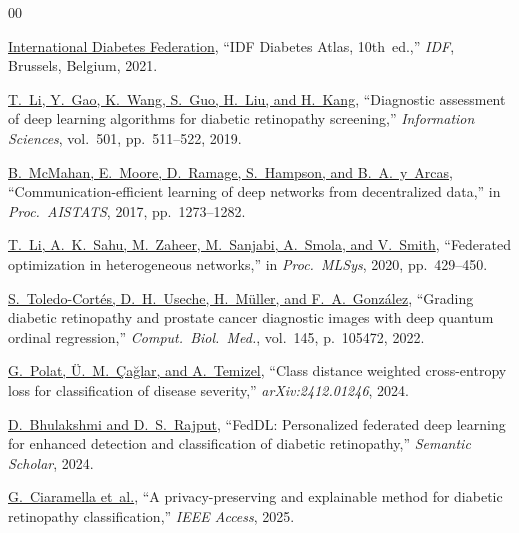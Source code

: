 \balance  %

\hypersetup{allcolors=black, hidelinks}
\begin{thebibliography}{00}

\href{https://www.diabetesatlas.org}{International
Diabetes Federation}, ``IDF Diabetes Atlas, 10th~ed.,''
\textit{IDF}, Brussels, Belgium, 2021.

\href{https://doi.org/10.1016/j.ins.2019.06.011}{T.~Li,
Y.~Gao, K.~Wang, S.~Guo, H.~Liu, and H.~Kang},
``Diagnostic assessment of deep learning algorithms
for diabetic retinopathy screening,''
\textit{Information Sciences}, vol.~501,
pp.~511--522, 2019.

\href{https://proceedings.mlr.press/v54/mcmahan17a.html}{B.~McMahan,
E.~Moore, D.~Ramage, S.~Hampson, and B.~A.~y~Arcas},
``Communication-efficient learning of deep networks
from decentralized data,''
in \textit{Proc.\ AISTATS}, 2017, pp.~1273--1282.

\href{https://proceedings.mlsys.org/paper_files/paper/2020/hash/38af86134b65d0f10fe33d30dd76442e-Abstract.html}{T.~Li,
A.~K.~Sahu, M.~Zaheer, M.~Sanjabi, A.~Smola, and V.~Smith},
``Federated optimization in heterogeneous networks,''
in \textit{Proc.\ MLSys}, 2020, pp.~429--450.

\href{https://doi.org/10.1016/j.compbiomed.2022.105472}{S.~Toledo-Cort\'{e}s,
D.~H.~Useche, H.~M\"{u}ller, and F.~A.~Gonz\'{a}lez},
``Grading diabetic retinopathy and prostate cancer
diagnostic images with deep quantum ordinal regression,''
\textit{Comput.\ Biol.\ Med.}, vol.~145,
p.~105472, 2022.

\href{https://arxiv.org/abs/2412.01246}{G.~Polat,
\"{U}.~M.~\c{C}a\u{g}lar, and A.~Temizel},
``Class distance weighted cross-entropy loss for
classification of disease severity,''
\textit{arXiv:2412.01246}, 2024.

\href{https://pdfs.semanticscholar.org/e66b/5d4ade3cca4b7297c4cd8df2caa8218eca16.pdf}{D.~Bhulakshmi
and D.~S.~Rajput},
``FedDL: Personalized federated deep learning
for enhanced detection and classification of
diabetic retinopathy,''
\textit{Semantic Scholar}, 2024.

\href{https://ieeexplore.ieee.org/document/11456480}{G.~Ciaramella
et~al.},
``A privacy-preserving and explainable method
for diabetic retinopathy classification,''
\textit{IEEE Access}, 2025.


\end{thebibliography}
